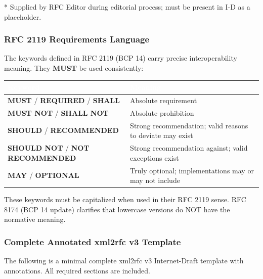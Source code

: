 \documentclass[11pt,letterpaper]{article}
\newcommand{\tableheader}[1]{\textbf{\sffamily\textcolor{white}{#1}}}
\begin{document}
* Supplied by RFC Editor during editorial process; must be present in I-D as a placeholder.

\subsubsection{RFC 2119 Requirements Language}

The keywords defined in RFC 2119 (BCP 14) carry precise interoperability meaning. They \textbf{MUST} be used consistently:

\begin{center}
\begin{tabularx}{\textwidth}{L{3.5cm}X}
\toprule
{}
\tableheader{Keyword} & \tableheader{Meaning} \\
\midrule
\textbf{MUST} / \textbf{REQUIRED} / \textbf{SHALL} & Absolute requirement \\
\textbf{MUST NOT} / \textbf{SHALL NOT} & Absolute prohibition \\
\textbf{SHOULD} / \textbf{RECOMMENDED} & Strong recommendation; valid reasons to deviate may exist \\
\textbf{SHOULD NOT} / \textbf{NOT RECOMMENDED} & Strong recommendation against; valid exceptions exist \\
\textbf{MAY} / \textbf{OPTIONAL} & Truly optional; implementations may or may not include \\
\bottomrule
\end{tabularx}
\end{center}

These keywords must be capitalized when used in their RFC 2119 sense. RFC 8174 (BCP 14 update) clarifies that lowercase versions do NOT have the normative meaning.

\subsubsection{Complete Annotated xml2rfc v3 Template}

The following is a minimal complete xml2rfc v3 Internet-Draft template with annotations. All required sections are included.
\end{document}
